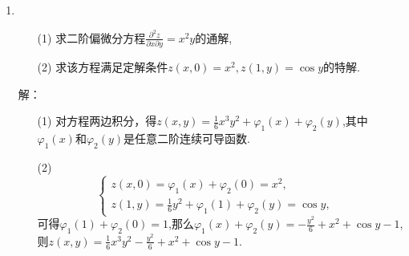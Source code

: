 \documentclass[11pt]{article}
\begin{document}
\begin{enumerate}
        \item
        \begin{enumerate}
            \item[(1)] 求二阶偏微分方程$\frac{\partial^2 z}{\partial x \partial y}=x^{2}y$的通解,
            \item[(2)] 求该方程满足定解条件$z(x,0)=x^2,z(1,y)=\cos y$的特解.
        \end{enumerate}
        解：
        \begin{enumerate}
            \item[(1)] 对方程两边积分，得$z(x,y)=\frac{1}{6}x^{3}y^2+\varphi_1(x)+\varphi_2(y)$,其中$\varphi_1(x)$和$\varphi_2(y)$是任意二阶连续可导函数.
            \item[(2)] \begin{equation*}
            \left\{
             \begin{array}{lr}
             z(x,0)=\varphi_1(x)+\varphi_2(0)=x^2, &  \\
             z(1,y)=\frac{1}{6}y^2+\varphi_1(1)+\varphi_2(y)=\cos y, &
             \end{array}
            \right.
            \end{equation*}
             可得$\varphi_1(1)+\varphi_2(0)=1$,那么$\varphi_1(x)+\varphi_2(y)=-\frac{y^2}{6}+x^2+\cos y-1$,\\则$z(x,y)=\frac{1}{6}x^{3}y^2-\frac{y^2}{6}+x^2+\cos y-1$.
        \end{enumerate}

    \end{enumerate}
\end{document}
